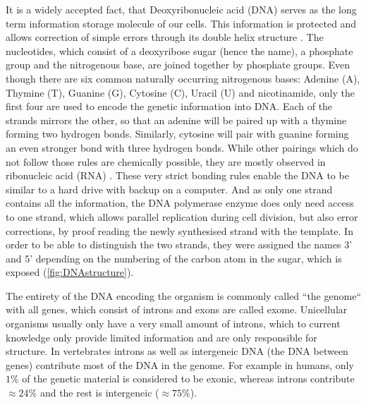 It is a widely accepted fact, that Deoxyribonucleic acid (DNA) serves as the long term information storage molecule of our cells. This information is protected and allows correction of simple errors through its double helix structure \cite{Watson1953,Liang1998}. The nucleotides, which consist of a deoxyribose sugar (hence the name), a phosphate group and the nitrogenous base, are joined together by phosphate groups. Even though there are six common naturally occurring nitrogenous bases: Adenine (A), Thymine (T), Guanine (G), Cytosine (C), Uracil (U) and nicotinamide, only the first four are used to encode the genetic information into DNA. Each of the strands mirrors the other, so that an adenine will be paired up with a thymine forming two hydrogen bonds. Similarly, cytosine will pair with guanine forming an even stronger bond with three hydrogen bonds. While other pairings which do not follow those rules are chemically possible, they are mostly observed in ribonucleic acid (RNA) \cite{Sinden1994}. These very strict bonding rules enable the DNA to be similar to a hard drive with backup on a computer. And as only one strand contains all the information, the DNA polymerase enzyme does only need access to one strand, which allows parallel replication during cell division, but also error corrections, by proof reading the newly synthesised strand with the template. In order to be able to distinguish the two strands, they were assigned the names 3' and 5' depending on the numbering of the carbon atom in the sugar, which is exposed (\autoref{fig:DNAstructure}).

The entirety of the DNA encoding the organism is commonly called ``the genome`` with all genes, which consist of introns and exons are called exome. Unicellular organisms usually only have a very small amount of introns, which to current knowledge only provide limited information and are only responsible for structure. In vertebrates  introns as well as intergeneic DNA (the DNA between genes) contribute most of the DNA in the genome. For example in humans, only $1\%$ of the genetic material is considered to be exonic, whereas introns contribute $\approx 24\%$ and the rest is intergeneic ($\approx 75\%$)\cite{Venter2001}.

